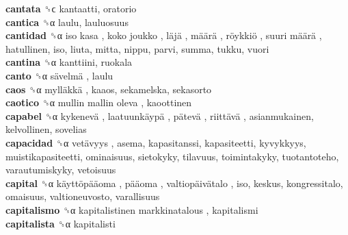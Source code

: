 \textbf{cantata} ␝ϲ  kantaatti, oratorio  \\
\textbf{cantica} ␝α  laulu, lauluosuus  \\
\textbf{cantidad} ␝α   iso kasa ,  koko joukko ,  läjä ,  määrä ,  röykkiö ,  suuri määrä , hatullinen, iso, liuta, mitta, nippu, parvi, summa, tukku, vuori  \\
\textbf{cantina} ␝α  kanttiini, ruokala  \\
\textbf{canto} ␝α   sävelmä , laulu  \\
\textbf{caos} ␝α   mylläkkä , kaaos, sekamelska, sekasorto  \\
\textbf{caotico} ␝α   mullin mallin oleva , kaoottinen  \\
\textbf{capabel} ␝α   kykenevä ,  laatuunkäypä ,  pätevä ,  riittävä , asianmukainen, kelvollinen, sovelias  \\
\textbf{capacidad} ␝α   vetävyys , asema, kapasitanssi, kapasiteetti, kyvykkyys, muistikapasiteetti, ominaisuus, sietokyky, tilavuus, toimintakyky, tuotantoteho, varautumiskyky, vetoisuus  \\
\textbf{capital} ␝α   käyttöpääoma ,  pääoma ,  valtiopäivätalo , iso, keskus, kongressitalo, omaisuus, valtioneuvosto, varallisuus  \\
\textbf{capitalismo} ␝α   kapitalistinen markkinatalous , kapitalismi  \\
\textbf{capitalista} ␝α  kapitalisti  \\
